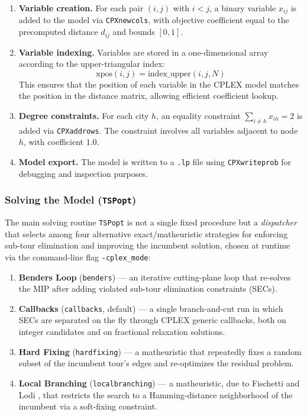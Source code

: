 \documentclass{article}
\begin{document}
\begin{enumerate}
    \item \textbf{Variable creation.} For each pair $(i, j)$ with $i < j$, a binary variable
          $x_{ij}$ is added to the model via \texttt{CPXnewcols}, with objective coefficient
          equal to the precomputed distance $d_{ij}$ and bounds $[0, 1]$.

    \item \textbf{Variable indexing.} Variables are stored in a one-dimensional array
          according to the upper-triangular index:
          \[
          \text{xpos}(i, j) = \text{index\_upper}(i, j, N)
          \]
          This ensures that the position of each variable in the CPLEX model matches the
          position in the distance matrix, allowing efficient coefficient lookup.

    \item \textbf{Degree constraints.} For each city $h$, an equality constraint
          $\sum_{i \neq h} x_{ih} = 2$ is added via \texttt{CPXaddrows}. The constraint
          involves all variables adjacent to node $h$, with coefficient $1.0$.

    \item \textbf{Model export.} The model is written to a \texttt{.lp} file using
          \texttt{CPXwriteprob} for debugging and inspection purposes.
\end{enumerate}

\subsubsection{Solving the Model (\texttt{TSPopt})}
\label{sec:tspopt}

The main solving routine \texttt{TSPopt} is not a single fixed procedure but a
\textit{dispatcher} that selects among four alternative exact/matheuristic strategies for
enforcing sub-tour elimination and improving the incumbent solution, chosen at runtime via
the command-line flag \texttt{-cplex\_mode}:

\begin{enumerate}
    \item \textbf{Benders Loop} (\texttt{benders}) --- an iterative cutting-plane loop that
          re-solves the MIP after adding violated sub-tour elimination constraints (SECs).
    \item \textbf{Callbacks} (\texttt{callbacks}, default) --- a single branch-and-cut run in
          which SECs are separated on the fly through CPLEX generic callbacks, both on integer
          candidates and on fractional relaxation solutions.
    \item \textbf{Hard Fixing} (\texttt{hardfixing}) --- a matheuristic that repeatedly fixes a
          random subset of the incumbent tour's edges and re-optimizes the residual problem.
    \item \textbf{Local Branching} (\texttt{localbranching}) --- a matheuristic, due to
          Fischetti and Lodi \cite{fischetti2003}, that restricts the search to a
          Hamming-distance neighborhood of the incumbent via a soft-fixing constraint.
\end{enumerate}
\end{document}
